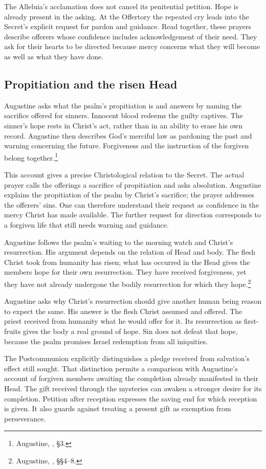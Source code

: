 The Alleluia's acclamation does not cancel its penitential petition.
Hope is already present in the asking. At the Offertory the repeated
cry leads into the Secret's explicit request for pardon and guidance.
Read together, these prayers describe offerers whose confidence
includes acknowledgement of their need. They ask for their hearts
to be directed because mercy concerns what they will become as well
as what they have done.

\subsection{Propitiation and the risen Head}
Augustine asks what the psalm's propitiation is and answers by naming
the sacrifice offered for sinners. Innocent blood redeems the guilty
captives. The sinner's hope rests in Christ's act, rather than in an
ability to erase his own record. Augustine then describes God's merciful
law as pardoning the past and warning concerning the future. Forgiveness
and the instruction of the forgiven belong together.\footnote{Augustine,
, §3.}

This account gives a precise Christological relation to the Secret.
The actual prayer calls the offerings a sacrifice of propitiation
and asks absolution. Augustine explains the propitiation of the
psalm by Christ's sacrifice; the prayer addresses the offerers' sins.
One can therefore understand their request as confidence in the mercy
Christ has made available. The further request for direction corresponds
to a forgiven life that still needs warning and guidance.

Augustine follows the psalm's waiting to the morning watch and Christ's
resurrection. His argument depends on the relation of Head and body.
The flesh Christ took from humanity has risen; what has occurred in
the Head gives the members hope for their own resurrection. They
have received forgiveness, yet they have not already undergone the
bodily resurrection for which they hope.\footnote{Augustine,
, §§4--8.}

Augustine asks why Christ's resurrection should give another human
being reason to expect the same. His answer is the flesh Christ
assumed and offered. The priest received from humanity what he would
offer for it. Its resurrection as first-fruits gives the body a real
ground of hope. Sin does not defeat that hope, because the psalm
promises Israel redemption from all iniquities.

The Postcommunion explicitly distinguishes a pledge received from
salvation's effect still sought. That distinction permits a comparison
with Augustine's account of forgiven members awaiting the completion
already manifested in their Head. The gift received through the
mysteries can awaken a stronger desire for its completion. Petition
after reception expresses the saving end for which reception is given.
It also guards against treating a present gift as exemption from
perseverance.

